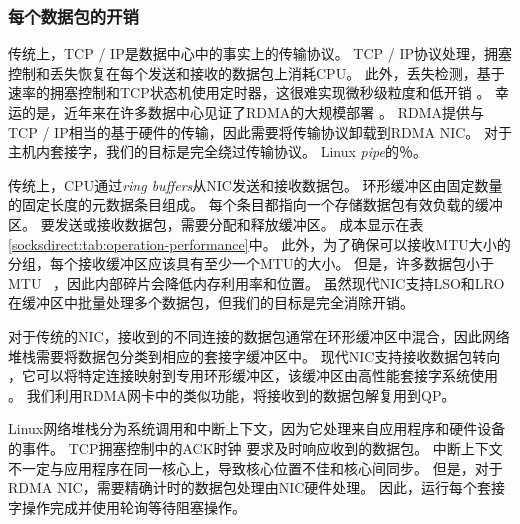 \subsubsection{每个数据包的开销}
\label{socksdirect:subsec:per-packet-overhead}
\quad

传统上，TCP / IP是数据中心中的事实上的传输协议。
TCP / IP协议处理，拥塞控制和丢失恢复在每个发送和接收的数据包上消耗CPU。
此外，丢失检测，基于速率的拥塞控制和TCP状态机使用定时器，这很难实现微秒级粒度和低开销 \cite{jeong2014mtcp}。
幸运的是，近年来在许多数据中心见证了RDMA的大规模部署 \cite {guo2016rdma,zhu2015congestion,mittal2015timely}。
RDMA提供与TCP / IP相当的基于硬件的传输，因此需要将传输协议卸载到RDMA NIC。
对于主机内套接字，我们的目标是完全绕过传输协议。 Linux \emph {pipe}的％。

传统上，CPU通过\emph {ring buffers}从NIC发送和接收数据包。
环形缓冲区由固定数量的固定长度的元数据条目组成。
每个条目都指向一个存储数据包有效负载的缓冲区。
要发送或接收数据包，需要分配和释放缓冲区。
成本显示在表 \ref {socksdirect:tab:operation-performance}中。
此外，为了确保可以接收MTU大小的分组，每个接收缓冲区应该具有至少一个MTU的大小。
但是，许多数据包小于MTU~ \cite {thompson1997wide}，因此内部碎片会降低内存利用率和位置。
虽然现代NIC支持LSO和LRO~ \cite {lsolro}在缓冲区中批量处理多个数据包，但我们的目标是完全消除开销。

对于传统的NIC，接收到的不同连接的数据包通常在环形缓冲区中混合，因此网络堆栈需要将数据包分类到相应的套接字缓冲区中。
现代NIC支持接收数据包转向 \cite {mellanox}，它可以将特定连接映射到专用环形缓冲区，该缓冲区由高性能套接字系统使用 \cite {jeong2014mtcp,lin2016scalable,libvma}。
我们利用RDMA网卡中的类似功能，将接收到的数据包解复用到QP。

Linux网络堆栈分为系统调用和中断上下文，因为它处理来自应用程序和硬件设备的事件。
TCP拥塞控制中的ACK时钟 \cite {mprdma}要求及时响应收到的数据包。
中断上下文不一定与应用程序在同一核心上，导致核心位置不佳和核心间同步。
但是，对于RDMA NIC，需要精确计时的数据包处理由NIC硬件处理。
因此，\libipc {}运行每个套接字操作完成并使用轮询等待阻塞操作。

